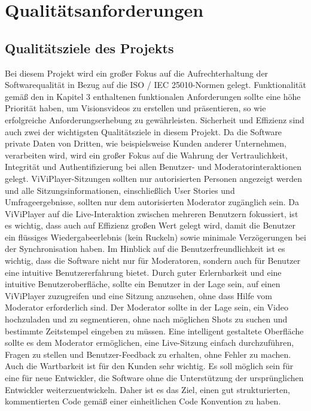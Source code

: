 \section{Qualitätsanforderungen}

	\subsection{Qualitätsziele des Projekts}
	
	Bei diesem Projekt wird ein großer Fokus auf die Aufrechterhaltung der Softwarequalität in Bezug auf die ISO / IEC 25010-Normen gelegt. 
    \linebreak
    Funktionalität gemäß den in Kapitel 3 enthaltenen funktionalen Anforderungen sollte eine höhe Priorität haben, um Visionsvideos zu erstellen und präsentieren, so wie erfolgreiche Anforderungserhebung zu gewährleisten.
    \linebreak
    Sicherheit und Effizienz sind auch zwei der wichtigsten Qualitätsziele in diesem Projekt. Da die Software private Daten von Dritten, wie beispielsweise Kunden anderer Unternehmen, verarbeiten wird, wird ein großer Fokus auf die Wahrung der Vertraulichkeit, Integrität und Authentifizierung bei allen Benutzer- und Moderatorinteraktionen gelegt. ViViPlayer-Sitzungen sollten nur autorisierten Personen angezeigt werden und alle Sitzungsinformationen, einschließlich User Stories und Umfrageergebnisse, sollten nur dem autorisierten Moderator zugänglich sein. 
    \linebreak
    Da ViViPlayer auf die Live-Interaktion zwischen mehreren Benutzern fokussiert, ist es wichtig, dass auch auf Effizienz großen Wert gelegt wird, damit die Benutzer ein flüssiges Wiedergabeerlebnis (kein Ruckeln) sowie minimale Verzögerungen bei der Synchronisation haben.
    \linebreak
    Im Hinblick auf die Benutzerfreundlichkeit ist es wichtig, dass die Software nicht nur für Moderatoren, sondern auch für Benutzer eine intuitive Benutzererfahrung bietet.  Durch guter Erlernbarkeit und eine intuitive Benutzeroberfläche, sollte ein Benutzer in der Lage sein, auf einen ViViPlayer zuzugreifen und eine Sitzung anzusehen, ohne dass Hilfe vom Moderator erforderlich sind.  Der Moderator sollte in der Lage sein, ein Video hochzuladen und zu segmentieren, ohne nach möglichen Shots zu suchen und bestimmte Zeitstempel eingeben zu müssen. Eine intelligent gestaltete Oberfläche sollte es dem Moderator ermöglichen, eine Live-Sitzung einfach durchzuführen,  Fragen zu stellen und Benutzer-Feedback zu erhalten, ohne Fehler zu machen.
    \linebreak
    \linebreak
    Auch die Wartbarkeit ist für den Kunden sehr wichtig. Es soll möglich sein für eine für neue Entwickler, die Software ohne die Unterstützung der ursprünglichen Entwickler weiterzuentwickeln. Daher ist
    es das Ziel, einen gut strukturierten, kommentierten Code gemäß einer einheitlichen Code Konvention zu haben.
    \linebreak
	
